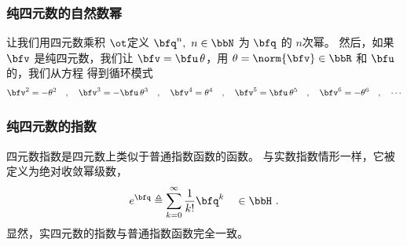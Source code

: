 \subsubsection{纯四元数的自然数幂}

让我们用四元数乘积 $\ot$定义 $\bfq^n, ~n\in\bbN$ 为 $\bfq$ 的 $n$次幂。
然后，如果 $\bfv$ 是纯四元数，我们让 $\bfv=\bfu\,\theta$，用 $\theta=\norm{\bfv}\in\bbR$ 和 $\bfu$ 的，我们从方程  得到循环模式
%
\begin{align}
\bfv^2 = -\theta^2 \quad,\quad
\bfv^3 = -\bfu\,\theta^3 \quad,\quad
\bfv^4 = \theta^4 \quad,\quad
\bfv^5 = \bfu\,\theta^5 \quad,\quad
\bfv^6 = -\theta^6 \quad,\quad
\cdots
\label{equ:qvPowers}
\end{align}
%




\subsubsection{纯四元数的指数}

四元数指数是四元数上类似于普通指数函数的函数。 
与实数指数情形一样，它被定义为绝对收敛幂级数，
%
\begin{align}
e^\bfq
\triangleq \sum_{k=0}^\infty \frac{1}{k!}\bfq^k \quad \in \bbH
~.
\label{equ:quatExpSeries}
\end{align}
%
显然，实四元数的指数与普通指数函数完全一致。 


